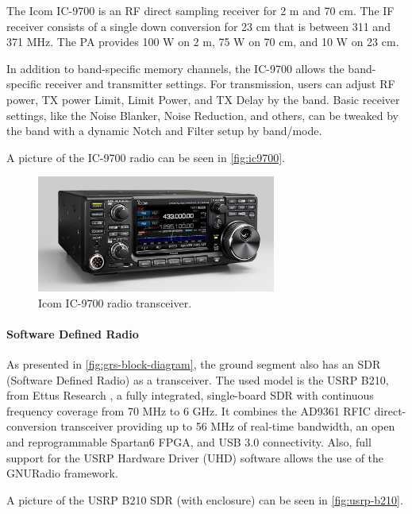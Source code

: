 The Icom IC-9700 \cite{ic9700} is an RF direct sampling receiver for 2 m and 70 cm. The IF receiver consists of a single down conversion for 23 cm that is between 311 and 371 MHz. The PA provides 100 W on 2 m, 75 W on 70 cm, and 10 W on 23 cm.

In addition to band-specific memory channels, the IC-9700 allows the band-specific receiver and transmitter settings. For transmission, users can adjust RF power, TX power Limit, Limit Power, and TX Delay by the band. Basic receiver settings, like the Noise Blanker, Noise Reduction, and others, can be tweaked by the band with a dynamic Notch and Filter setup by band/mode.

A picture of the IC-9700 radio can be seen in \autoref{fig:ic9700}.

\begin{figure}[!ht]
    \begin{center}
        \includegraphics[width=0.7\textwidth]{figures/ic-9700.jpg}
        \caption{Icom IC-9700 radio transceiver.}
        \label{fig:ic9700}
    \end{center}
\end{figure}

\paragraph{Software Defined Radio}

As presented in \autoref{fig:grs-block-diagram}, the ground segment also has an SDR (Software Defined Radio) as a transceiver. The used model is the USRP B210, from Ettus Research \cite{b210}, a fully integrated, single-board SDR with continuous frequency coverage from 70 MHz to 6 GHz. It combines the AD9361 RFIC direct-conversion transceiver providing up to 56 MHz of real-time bandwidth, an open and reprogrammable Spartan6 FPGA, and USB 3.0 connectivity. Also, full support for the USRP Hardware Driver (UHD) software allows the use of the GNURadio framework.

A picture of the USRP B210 SDR (with enclosure) can be seen in \autoref{fig:usrp-b210}.

